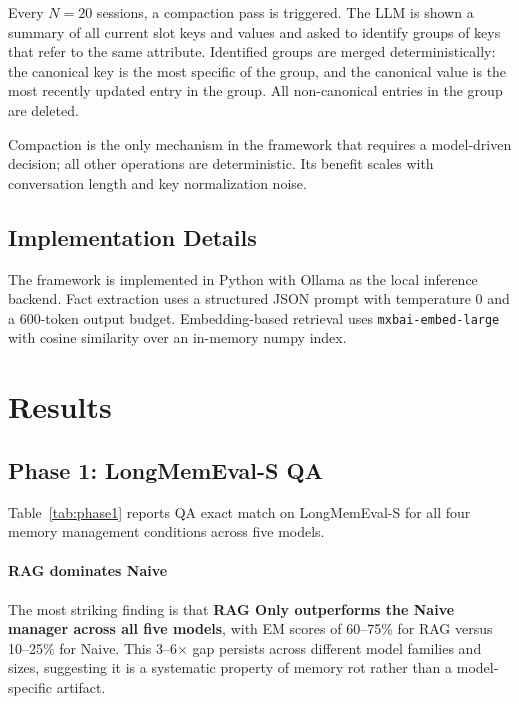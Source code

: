 \documentclass[10pt, twocolumn]{article}
\begin{document}
Every $N=20$ sessions, a compaction pass is triggered.
The LLM is shown a summary of all current slot keys and values and asked
to identify groups of keys that refer to the same attribute.
Identified groups are merged deterministically: the canonical key is the
most specific of the group, and the canonical value is the most recently
updated entry in the group.
All non-canonical entries in the group are deleted.

Compaction is the only mechanism in the framework that requires a
model-driven decision; all other operations are deterministic.
Its benefit scales with conversation length and key normalization noise.

\subsection{Implementation Details}

The framework is implemented in Python with Ollama as the local inference
backend.
Fact extraction uses a structured JSON prompt with temperature 0 and a
600-token output budget.
Embedding-based retrieval uses \texttt{mxbai-embed-large} with cosine
similarity over an in-memory numpy index.

\section{Results}
\label{sec:results}

\subsection{Phase 1: LongMemEval-S QA}
\label{sec:phase1}

Table~\ref{tab:phase1} reports QA exact match on LongMemEval-S for all
four memory management conditions across five models.

\paragraph{RAG dominates Naive}
The most striking finding is that \textbf{RAG Only outperforms the Naive
manager across all five models}, with EM scores of 60--75\% for RAG versus
10--25\% for Naive.
This 3--6$\times$ gap persists across different model families and sizes,
suggesting it is a systematic property of memory rot rather than a
model-specific artifact.
\end{document}
